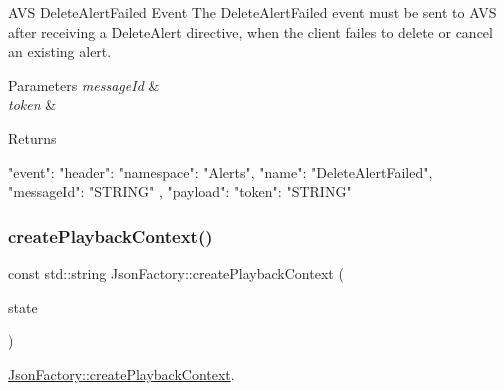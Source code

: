 A\+VS Delete\+Alert\+Failed Event The Delete\+Alert\+Failed event must be sent to A\+VS after receiving a Delete\+Alert directive, when the client failes to delete or cancel an existing alert. 
\begin{DoxyParams}{Parameters}
{\em message\+Id} & \\
\hline
{\em token} & \\
\hline
\end{DoxyParams}
\begin{DoxyReturn}{Returns}
\begin{DoxyVerb} {
     "event": {
         "header": {
             "namespace": "Alerts",
             "name": "DeleteAlertFailed",
             "messageId": "{{STRING}}"
         },
         "payload": {
             "token": "{{STRING}}"
         }
      }
  }\end{DoxyVerb}
 
\end{DoxyReturn}
\mbox{\label{classAVSJson_1_1JsonFactory_afa83d7cfe2079159f3f8923d0ad82cf2}} 
\subsubsection{\texorpdfstring{create\+Playback\+Context()}{createPlaybackContext()}}
{\footnotesize\ttfamily const std\+::string Json\+Factory\+::create\+Playback\+Context (\begin{DoxyParamCaption}\item[{const \hyperlink{structAVSJson_1_1PlaybackState}{Playback\+State} $\ast$}]{state }\end{DoxyParamCaption})\hspace{0.3cm}{\ttfamily [protected]}}



\hyperlink{classAVSJson_1_1JsonFactory_afa83d7cfe2079159f3f8923d0ad82cf2}{Json\+Factory\+::create\+Playback\+Context}. 

